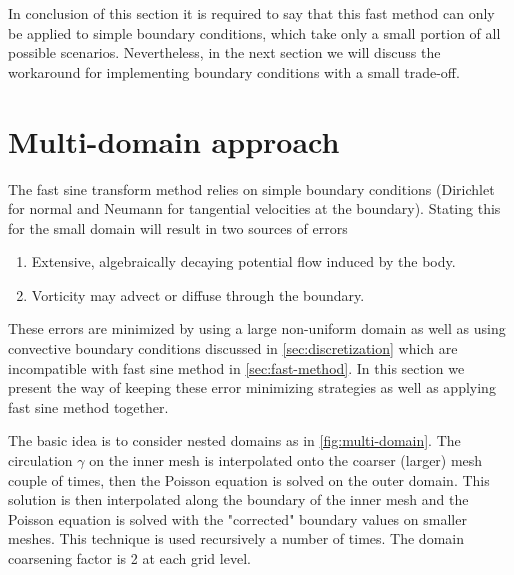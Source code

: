 \documentclass{article}
\numberwithin{equation}{section}
\begin{document}
In conclusion of this section it is required to say that this fast method can only be applied to simple boundary conditions, which take only a small portion of all possible scenarios. Nevertheless, in the next section we will discuss the workaround for implementing boundary conditions with a small trade-off.

\section{Multi-domain approach}\label{sec:multi-domain-approach}

The fast sine transform method relies on simple boundary conditions (Dirichlet for normal and Neumann for tangential velocities at the boundary). Stating this for the small domain will result in two sources of errors
\begin{enumerate}
  \item Extensive, algebraically decaying potential flow induced by the body.
  \item Vorticity may advect or diffuse through the boundary. 
\end{enumerate}
These errors are minimized by using a large non-uniform domain as well as using convective boundary conditions discussed in \cref{sec:discretization} which are incompatible with fast sine method in \cref{sec:fast-method}. In this section we present the way of keeping these error minimizing strategies as well as applying fast sine method together. 

The basic idea is to consider nested domains as in \cref{fig:multi-domain}. The circulation $\gamma$ on the inner mesh is interpolated onto the coarser (larger) mesh couple of times, then the Poisson equation is solved on the outer domain. This solution is then interpolated along the boundary of the inner mesh and the Poisson equation is solved with the "corrected" boundary values on smaller meshes.  This technique is used recursively a number of times. The domain coarsening factor is 2 at each grid level. 
\end{document}
